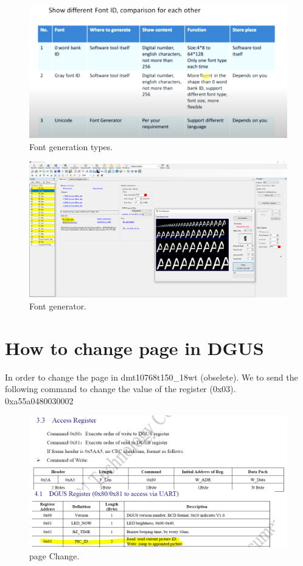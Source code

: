 \documentclass[12pt, A4]{article} %
\begin{document}
\begin{figure}[!htb] %
	\centering
	\includegraphics[width=12cm]{fontType} 
	\caption{Font generation types.\\}
\end{figure}
\begin{figure}[!htb] %
	\centering
	\includegraphics[width=12cm]{fontGenerator} 
	\caption{Font generator.\\}
\end{figure}

\newpage

\section{How to change page in DGUS}
In order to change the page in dmt10768t150\_18wt (obselete). We to send the following command to change the value of the register (0x03).\\

{\huge 0xa55a0480030002\\}

\begin{figure}[!htb] %
	\centering
	\includegraphics[width=12cm]{pageChange} 
	\caption{page Change.\\}
\end{figure}
\end{document}
